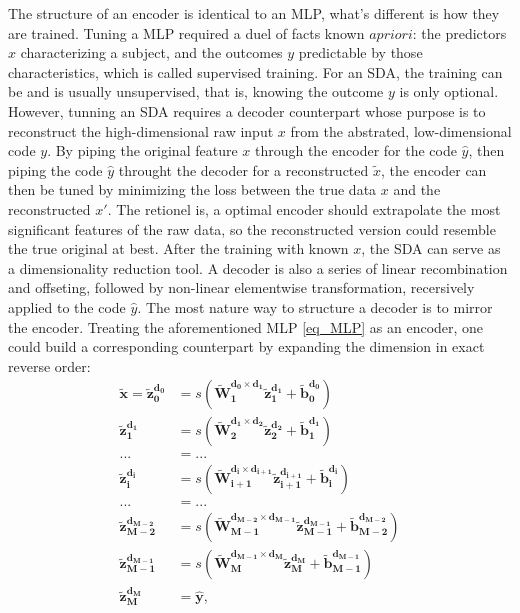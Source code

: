 \documentclass[twocolumn]{article}
\begin{document}
The structure of an encoder is identical to an MLP, what's different is how they are trained. Tuning a MLP required a duel of facts known $a priori$: the predictors $x$ characterizing a subject, and the outcomes $y$ predictable by those characteristics, which is called supervised training. For an SDA, the training can be and is usually unsupervised, that is, knowing the outcome $y$ is only optional. However, tunning an SDA requires a decoder counterpart whose purpose is to reconstruct the  high-dimensional raw input $x$ from the abstrated, low-dimensional code $y$. By piping the original feature $x$ through the encoder for the code $\hat{y}$, then piping the code $\hat{y}$ throught the decoder for a reconstructed $\tilde{x}$, the encoder can then be tuned by minimizing the loss between the true data $x$ and the reconstructed $x'$. The retionel is, a optimal encoder should extrapolate the most significant features of the raw data, so the reconstructed version could resemble the true original at best. After the training with known $x$, the SDA can serve as a dimensionality reduction tool.
A decoder is also a series of linear recombination and offseting, followed by non-linear elementwise transformation, recersively applied to the code $\hat{y}$. The most nature way to structure a decoder is to mirror the encoder. Treating the aforementioned MLP \ref{eq_MLP} as an encoder, one could build a corresponding counterpart by expanding the dimension in exact reverse order:
\begin{equation} \label{eq_DEC}
\begin{split}
  \boldsymbol{\tilde{x}}=
  \boldsymbol{\tilde{z}_{0  }^{d_{0  }}} &= s(\boldsymbol{\tilde{W}_{1  }^{d_{0  } \times d_{1  }} \tilde{z}_{1  }^{d_{1  }}}+\boldsymbol{\tilde{b}_{0  }^{d_{0  }}}) \\
  \boldsymbol{\tilde{z}_{1  }^{d_{1  }}} &= s(\boldsymbol{\tilde{W}_{2  }^{d_{1  } \times d_{2  }} \tilde{z}_{2  }^{d_{2  }}}+\boldsymbol{\tilde{b}_{1  }^{d_{1  }}}) \\
  ... &= ... \\
  \boldsymbol{\tilde{z}_{i  }^{d_{i  }}} &= s(\boldsymbol{\tilde{W}_{i+1}^{d_{i  } \times d_{i+1}} \tilde{z}_{i+1}^{d_{i+1}}}+\boldsymbol{\tilde{b}_{i  }^{d_{i  }}}) \\
  ... &= ... \\
  \boldsymbol{\tilde{z}_{M-2}^{d_{M-2}}} &= s(\boldsymbol{\tilde{W}_{M-1}^{d_{M-2} \times d_{M-1}} \tilde{z}_{M-1}^{d_{M-1}}}+\boldsymbol{\tilde{b}_{M-2}^{d_{M-2}}}) \\
  \boldsymbol{\tilde{z}_{M-1}^{d_{M-1}}} &= s(\boldsymbol{\tilde{W}_{M  }^{d_{M-1} \times d_{M  }} \tilde{z}_{M  }^{d_{M  }}}+\boldsymbol{\tilde{b}_{M-1}^{d_{M-1}}}) \\
  \boldsymbol{\tilde{z}_{M  }^{d_{M  }}} &= \boldsymbol{\hat{y}},
\end{split}
\end{equation}
\end{document}

